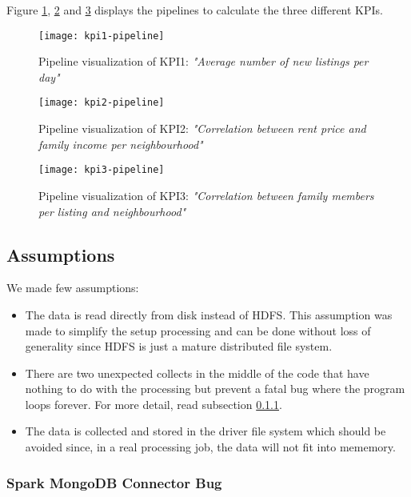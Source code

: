 \documentclass[12pt, a4paper]{article}
\begin{document}
Figure \ref{fig:KPI1}, \ref{fig:KPI2} and \ref{fig:KPI3} displays the pipelines to calculate the three different KPIs.

\begin{figure}[H]
\centering
{}
\texttt{[image: kpi1-pipeline]}
\caption{Pipeline visualization of KPI1: \emph{"Average number of new listings per day"}}
\label{fig:KPI1}
\end{figure}

\begin{figure}[H]
\centering
{}
\texttt{[image: kpi2-pipeline]}
\caption{Pipeline visualization of KPI2: \emph{"Correlation between rent price and family income per neighbourhood"}}
\label{fig:KPI2}
\end{figure}

\begin{figure}[H]
\centering
{}
\texttt{[image: kpi3-pipeline]}
\caption{Pipeline visualization of KPI3: \emph{"Correlation between family members per listing and neighbourhood"}}
\label{fig:KPI3}
\end{figure}

\subsection{Assumptions}

We made few assumptions:

\begin{itemize}
    \item The data is read directly from disk instead of HDFS. This assumption was made to simplify the setup processing and can be done without loss of generality since HDFS is just a mature distributed file system.
    \item There are two unexpected collects in the middle of the code that have nothing to do with the processing but prevent a fatal bug where the program loops forever. For more detail, read subsection \ref{subsubsection:mongodb}.
    \item The data is collected and stored in the driver file system which should be avoided since, in a real processing job, the data will not fit into mememory.
\end{itemize}

\subsubsection{Spark MongoDB Connector Bug}\label{subsubsection:mongodb}
\end{document}
